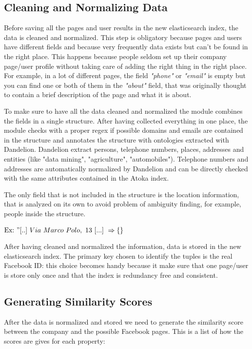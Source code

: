 \subsection{Cleaning and Normalizing Data}

Before saving all the pages and user results in the new elasticsearch index, the data is cleaned and normalized. This step is obligatory because pages and users have different fields and because very frequently data exists but can't be found in the right place. This happens because people seldom set up their company page/user profile without taking care of adding the right thing in the right place. For example, in a lot of different pages, the field \textit{"phone"} or \textit{"email"} is empty but you can find one or both of them in the \textit{"about"} field, that was originally thought to contain a brief description of the page and what it is about.

To make sure to have all the data cleaned and normalized the module combines the fields in a single structure. After having collected everything in one place, the module checks with a proper regex if possible domains and emails are contained in the structure and annotates the structure with ontologies extracted with Dandelion. Dandelion extract persons, telephone numbers, places, addresses and entities (like "data mining", "agriculture", "automobiles").
Telephone numbers and addresses are automatically normalized by Dandelion and can be directly checked with the same attributes contained in the Atoka index.

The only field that is not included in the structure is the location information, that is analyzed on its own to avoid problem of ambiguity finding, for example, people inside the structure.

$ \text{Ex:}\ "[..]\ Via\ Marco\ Polo,\ 13\ [...]\ \Rightarrow \{\} $

After having cleaned and normalized the information, data is stored in the new elasticsearch index. The primary key chosen to identify the tuples is the real Facebook ID: this choice becomes handy because it make sure that one page/user is store only once and that the index is redundancy free and consistent.

\subsection{Generating Similarity Scores}
After the data is normalized and stored we need to generate the similarity score between the company and the possible Facebook pages. This is a list of how the scores are gives for each property:

